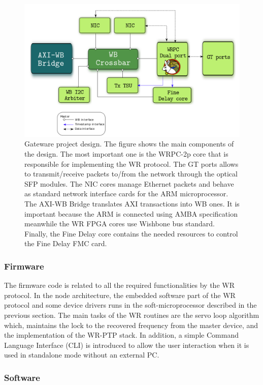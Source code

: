 \begin{figure}[H] \centering
	\includegraphics[scale=0.4]{img/gateware_first_level} \caption{Gateware
	project design. The figure shows the main components of the design. The
	most important one is the WRPC-2p core that is responsible for
	implementing the WR protocol. The GT ports allows to transmit/receive
	packets to/from the network through the optical SFP modules. The NIC
	cores manage Ethernet packets and behave as standard network interface
	cards for the ARM microprocessor. The AXI-WB Bridge translates AXI
	transactions into WB ones. It is important because the ARM is connected
	using AMBA specification meanwhile the WR FPGA cores use Wishbone bus
	standard. Finally, the Fine Delay core contains the needed resources to
control the Fine Delay FMC card.} \label{fig:gateware_first_level} \end{figure}

\subsubsection{Firmware} \label{subsec:firmware}

The firmware code is related to all the required functionalities by the WR
protocol. In the node architecture, the embedded software part of the WR
protocol and some device drivers runs in the soft-microprocessor described in
the previous section. The main tasks of the WR routines are the servo loop
algorithm which, maintains the lock to the recovered frequency from the master
device, and the implementation of the WR-PTP stack. In addition, a simple
Command Language Interface (CLI) is introduced to allow the user interaction
when it is used in standalone mode without an external PC.

\subsubsection{Software} \label{subsec:software}

